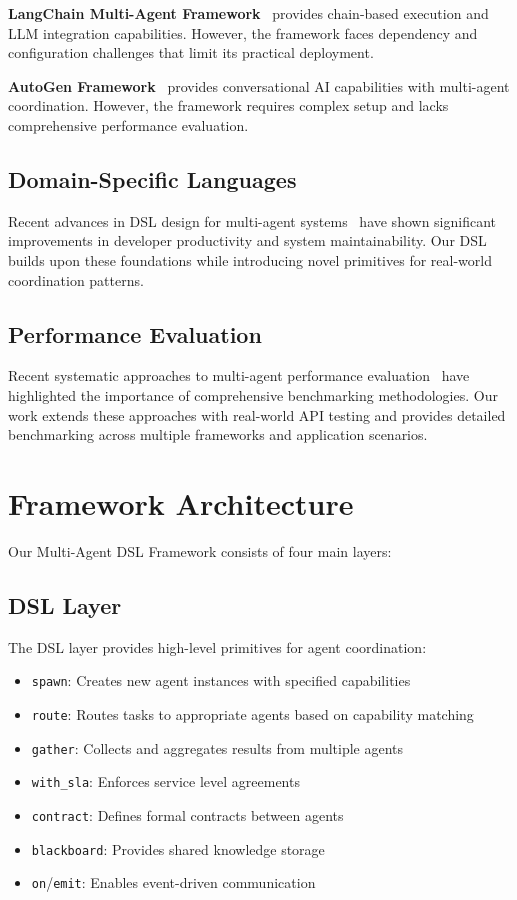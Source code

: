 \documentclass[conference]{IEEEtran}
\begin{document}
\textbf{LangChain Multi-Agent Framework}~\cite{langchain2023} provides chain-based execution and LLM integration capabilities. However, the framework faces dependency and configuration challenges that limit its practical deployment.

\textbf{AutoGen Framework}~\cite{autogen2023} provides conversational AI capabilities with multi-agent coordination. However, the framework requires complex setup and lacks comprehensive performance evaluation.

\subsection{Domain-Specific Languages}

Recent advances in DSL design for multi-agent systems~\cite{wang2025} have shown significant improvements in developer productivity and system maintainability. Our DSL builds upon these foundations while introducing novel primitives for real-world coordination patterns.

\subsection{Performance Evaluation}

Recent systematic approaches to multi-agent performance evaluation~\cite{liu2025} have highlighted the importance of comprehensive benchmarking methodologies. Our work extends these approaches with real-world API testing and provides detailed benchmarking across multiple frameworks and application scenarios.

\section{Framework Architecture}

Our Multi-Agent DSL Framework consists of four main layers:

\subsection{DSL Layer}

The DSL layer provides high-level primitives for agent coordination:

\begin{itemize}
\item \texttt{spawn}: Creates new agent instances with specified capabilities
\item \texttt{route}: Routes tasks to appropriate agents based on capability matching
\item \texttt{gather}: Collects and aggregates results from multiple agents
\item \texttt{with\_sla}: Enforces service level agreements
\item \texttt{contract}: Defines formal contracts between agents
\item \texttt{blackboard}: Provides shared knowledge storage
\item \texttt{on}/\texttt{emit}: Enables event-driven communication
\end{itemize}
\end{document}
